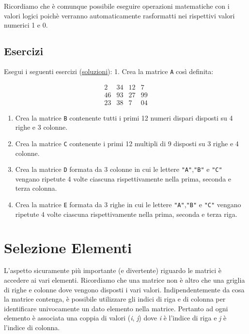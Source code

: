 \documentclass[
]{book}
\providecommand{\tightlist}{%
  \setlength{\itemsep}{0pt}\setlength{\parskip}{0pt}}
\begin{document}
Ricordiamo che è comunque possibile eseguire operazioni matematiche con i valori logici poichè verranno automaticamente rasformatti nei rispettivi valori numerici 1 e 0.

\hypertarget{esercizi-6}{%
\subsection*{Esercizi}\label{esercizi-6}}

Esegui i seguenti esercizi (\href{https://github.com/psicostat/Introduction2R/blob/master/exercises/chapter-09-matrices.R}{soluzioni}):
1. Crea la matrice \texttt{A} così definita:

\[
\begin{matrix}
2 & 34 & 12 & 7\\
46 & 93 & 27 & 99\\
23  & 38 & 7 & 04
\end{matrix}
\]

\begin{enumerate}
\def\labelenumi{\arabic{enumi}.}
\setcounter{enumi}{1}
\tightlist
\item
  Crea la matrice \texttt{B} contenente tutti i primi 12 numeri dispari disposti su 4 righe e 3 colonne.
\item
  Crea la matrice \texttt{C} contenente i primi 12 multipli di 9 disposti su 3 righe e 4 colonne.
\item
  Crea la matrice \texttt{D} formata da 3 colonne in cui le lettere \texttt{"A"},\texttt{"B"} e \texttt{"C"} vengano ripetute 4 volte ciascuna rispettivamente nella prima, seconda e terza colonna.
\item
  Crea la matrice \texttt{E} formata da 3 righe in cui le lettere \texttt{"A"},\texttt{"B"} e \texttt{"C"} vengano ripetute 4 volte ciascuna rispettivamente nella prima, seconda e terza riga.
\end{enumerate}

\hypertarget{sel-matrix}{%
\section{Selezione Elementi}\label{sel-matrix}}

L'aspetto sicuramente più importante (e divertente) riguardo le matrici è accedere ai vari elementi. Ricordiamo che una matrice non è altro che una griglia di righe e colonne dove vengono disposti i vari valori. Indipendentemente da cosa la matrice contenga, è possibile utilizzare gli indici di riga e di colonna per identificare univocamente un dato elemento nella matrice. Pertanto ad ogni elemento è associata una coppia di valori (\emph{i}, \emph{j}) dove \emph{i} è l'indice di riga e \emph{j} è l'indice di colonna.
\end{document}
